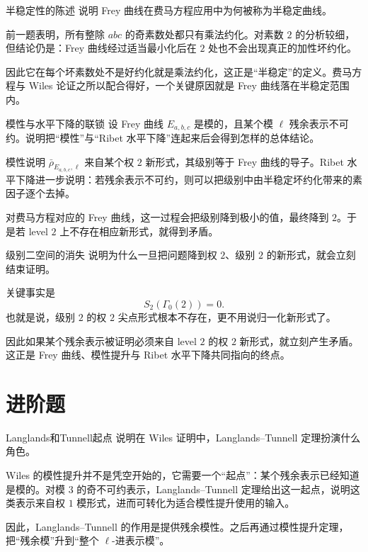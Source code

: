 \begin{problem}{半稳定性的陈述}
\easy
说明 Frey 曲线在费马方程应用中为何被称为半稳定曲线。
\end{problem}
\begin{solution}
前一题表明，所有整除 $abc$ 的奇素数处都只有乘法约化。对素数 $2$ 的分析较细，但结论仍是：Frey 曲线经过适当最小化后在 $2$ 处也不会出现真正的加性坏约化。

因此它在每个坏素数处不是好约化就是乘法约化，这正是“半稳定”的定义。费马方程与 Wiles 论证之所以配合得好，一个关键原因就是 Frey 曲线落在半稳定范围内。
\end{solution}

\begin{problem}{模性与水平下降的联锁}
\easy
设 Frey 曲线 $E_{a,b,c}$ 是模的，且某个模 $\ell$ 残余表示不可约。说明把“模性”与“Ribet 水平下降”连起来后会得到怎样的总体结论。
\end{problem}
\begin{solution}
模性说明 $\bar\rho_{E_{a,b,c},\ell}$ 来自某个权 $2$ 新形式，其级别等于 Frey 曲线的导子。Ribet 水平下降进一步说明：若残余表示不可约，则可以把级别中由半稳定坏约化带来的素因子逐个去掉。

对费马方程对应的 Frey 曲线，这一过程会把级别降到极小的值，最终降到 $2$。于是若 level $2$ 上不存在相应新形式，就得到矛盾。
\end{solution}

\begin{problem}{级别二空间的消失}
\easy
说明为什么一旦把问题降到权 $2$、级别 $2$ 的新形式，就会立刻结束证明。
\end{problem}
\begin{solution}
关键事实是
\[
S_2(\Gamma_0(2))=0.
\]
也就是说，级别 $2$ 的权 $2$ 尖点形式根本不存在，更不用说归一化新形式了。

因此如果某个残余表示被证明必须来自 level $2$ 的权 $2$ 新形式，就立刻产生矛盾。这正是 Frey 曲线、模性提升与 Ribet 水平下降共同指向的终点。
\end{solution}

\section{进阶题 \medium}

\begin{problem}{Langlands和Tunnell起点}
\medium
说明在 Wiles 证明中，Langlands--Tunnell 定理扮演什么角色。
\end{problem}
\begin{solution}
Wiles 的模性提升并不是凭空开始的，它需要一个“起点”：某个残余表示已经知道是模的。对模 $3$ 的奇不可约表示，Langlands--Tunnell 定理给出这一起点，说明这类表示来自权 $1$ 模形式，进而可转化为适合模性提升使用的输入。

因此，Langlands--Tunnell 的作用是提供残余模性。之后再通过模性提升定理，把“残余模”升到“整个 $\ell$-进表示模”。
\end{solution}


